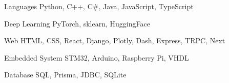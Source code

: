 

\begin{cvskills}

  \cvskill
    {Languages} %
    {Python, C++, C\#, Java, JavaScript, TypeScript} %

  \cvskill
    {Deep Learning} %
    {PyTorch, sklearn, HuggingFace} %

  \cvskill
    {Web} %
    {HTML, CSS, React, Django, Plotly, Dash, Express, TRPC, Next} %

  \cvskill
    {Embedded System} %
    {STM32, Arduino, Raspberry Pi, VHDL} %

  \cvskill
  {Database} %
  {SQL, Prisma, JDBC, SQLite} %

\end{cvskills}
